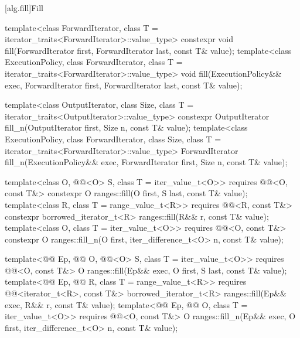 [alg.fill]{Fill}

%
%
\begin{itemdecl}
template<class ForwardIterator, class T = iterator_traits<ForwardIterator>::value_type>
  constexpr void fill(ForwardIterator first, ForwardIterator last, const T& value);
template<class ExecutionPolicy, class ForwardIterator,
         class T = iterator_traits<ForwardIterator>::value_type>
  void fill(ExecutionPolicy&& exec,
            ForwardIterator first, ForwardIterator last, const T& value);

template<class OutputIterator, class Size, class T = iterator_traits<OutputIterator>::value_type>
  constexpr OutputIterator fill_n(OutputIterator first, Size n, const T& value);
template<class ExecutionPolicy, class ForwardIterator, class Size,
         class T = iterator_traits<ForwardIterator>::value_type>
  ForwardIterator fill_n(ExecutionPolicy&& exec,
                         ForwardIterator first, Size n, const T& value);

template<class O, @@<O> S, class T = iter_value_t<O>>
  requires @@<O, const T&>
  constexpr O ranges::fill(O first, S last, const T& value);
template<class R, class T = range_value_t<R>>
  requires @@<R, const T&>
  constexpr borrowed_iterator_t<R> ranges::fill(R&& r, const T& value);
template<class O, class T = iter_value_t<O>>
  requires @@<O, const T&>
  constexpr O ranges::fill_n(O first, iter_difference_t<O> n, const T& value);

template<@@ Ep, @@ O, @@<O> S,
         class T = iter_value_t<O>>
  requires @@<O, const T&>
  O ranges::fill(Ep&& exec, O first, S last, const T& value);
template<@@ Ep, @@ R, class T = range_value_t<R>>
  requires @@<iterator_t<R>, const T&>
  borrowed_iterator_t<R> ranges::fill(Ep&& exec, R&& r, const T& value);
template<@@ Ep, @@ O, class T = iter_value_t<O>>
  requires @@<O, const T&>
  O ranges::fill_n(Ep&& exec, O first, iter_difference_t<O> n, const T& value);
\end{itemdecl}

